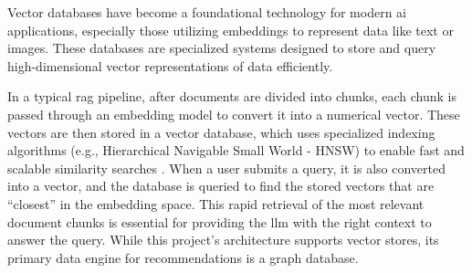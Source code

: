 Vector databases have become a foundational technology for modern \ac{ai} applications, especially those utilizing embeddings to represent data like text or images. These databases are specialized systems designed to store and query high-dimensional vector representations of data efficiently.

In a typical \ac{rag} pipeline, after documents are divided into chunks, each chunk is passed through an embedding model to convert it into a numerical vector. These vectors are then stored in a vector database, which uses specialized indexing algorithms (e.g., Hierarchical Navigable Small World - HNSW) to enable fast and scalable similarity searches \cite{SOTA-RAG-SURVEY}. When a user submits a query, it is also converted into a vector, and the database is queried to find the stored vectors that are ``closest'' in the embedding space. This rapid retrieval of the most relevant document chunks is essential for providing the \ac{llm} with the right context to answer the query. While this project's architecture supports vector stores, its primary data engine for recommendations is a graph database.

